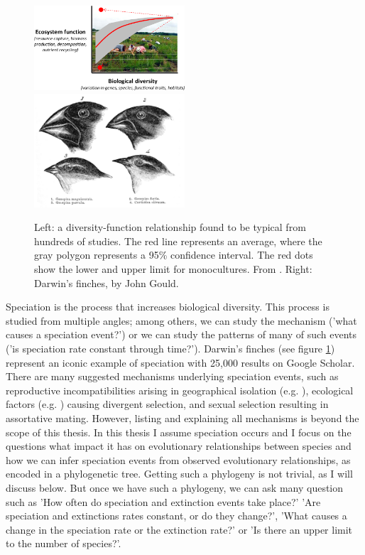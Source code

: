 \begin{figure}[H]
  \includegraphics[width=0.5\textwidth]{cardinale_et_al_fig_1.png}
  \includegraphics[width=0.5\textwidth]{Darwin's_finches_by_Gould.jpg}
  \caption{
    Left: a diversity-function relationship found to be typical from hundreds
    of studies. The red line represents an average, where the gray polygon
    represents a 95\% confidence interval. The red dots show the lower
    and upper limit for monocultures. From \cite{cardinale2012biodiversity}.
    Right: Darwin's finches, by John Gould.
  }
  \label{fig:cardinale_et_al_and_darwins_finches}
\end{figure}

Speciation is the process that increases biological diversity.
This process is studied from multiple angles; among others,
we can study the mechanism ('what
causes a speciation event?') or we can study the patterns of many
of such events ('is speciation rate constant through time?').
Darwin's finches (see figure \ref{fig:cardinale_et_al_and_darwins_finches}) 
represent an iconic example of speciation with 25,000 results on Google Scholar.
There are many suggested mechanisms underlying speciation events, such as reproductive incompatibilities arising in geographical isolation 
(e.g. \cite{mayr1942}), ecological factors (e.g. \cite{lack1947}) causing divergent selection, and sexual selection resulting in assortative mating. However, listing and explaining all mechanisms is beyond the scope of this thesis. In this thesis I assume speciation occurs and I focus on the questions what impact it has on evolutionary relationships between species and how we can infer speciation events from observed evolutionary relationships, as encoded in a phylogenetic tree. Getting such a phylogeny is not trivial, as I will discuss below. But once we have such a phylogeny, we can ask many question such 
as 'How often do speciation and extinction events take place?'
'Are speciation and extinctions rates constant, or do they change?',
'What causes a change in the speciation rate or the extinction rate?' or
'Is there an upper limit to the number of species?'. 


